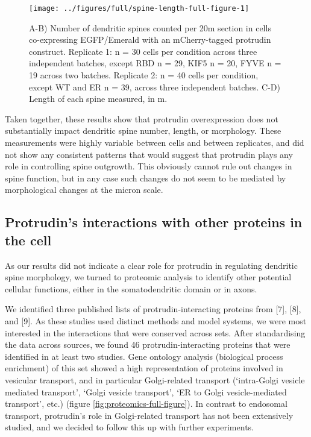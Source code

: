 \documentclass[
  12pt,
  a4paper,
]{book}
\begin{document}
\begin{figure}
\texttt{[image: ../figures/full/spine-length-full-figure-1]} \caption[Protrudin effect on dendritic spine length]{A-B) Number of dendritic spines counted per 20\textmu{}m section in cells co-expressing EGFP/Emerald with an mCherry-tagged protrudin construct.  Replicate 1: n = 30 cells per condition across three independent batches, except \textDelta{}RBD n = 29, \textDelta{}KIF5 n = 20, \textDelta{}FYVE n = 19 across two batches.  Replicate 2: n = 40 cells per condition, except WT and \textDelta{}ER n = 39, across three independent batches. C-D) Length of each spine measured, in \textmu{}m.}\label{fig:spine-length-full-figure}
\end{figure}

Taken together, these results show that protrudin overexpression does not substantially impact dendritic spine number, length, or morphology. These measurements were highly variable between cells and between replicates, and did not show any consistent patterns that would suggest that protrudin plays any role in controlling spine outgrowth. This obviously cannot rule out changes in spine function, but in any case such changes do not seem to be mediated by morphological changes at the micron scale.

\hypertarget{GO-analysis}{%
\subsection{Protrudin's interactions with other proteins in the cell}\label{GO-analysis}}

As our results did not indicate a clear role for protrudin in regulating dendritic spine morphology, we turned to proteomic analysis to identify other potential cellular functions, either in the somatodendritic domain or in axons.

We identified three published lists of protrudin-interacting proteins from {[}7{]}, {[}8{]}, and {[}9{]}. As these studies used distinct methods and model systems, we were most interested in the interactions that were conserved across sets. After standardising the data across sources, we found 46 protrudin-interacting proteins that were identified in at least two studies. Gene ontology analysis (biological process enrichment) of this set showed a high representation of proteins involved in vesicular transport, and in particular Golgi-related transport (`intra-Golgi vesicle mediated transport', `Golgi vesicle transport', `ER to Golgi vesicle-mediated transport', etc.) (figure \ref{fig:proteomics-full-figure}). In contrast to endosomal transport, protrudin's role in Golgi-related transport has not been extensively studied, and we decided to follow this up with further experiments.
\end{document}
